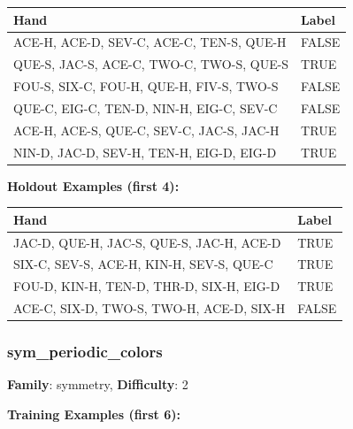 \documentclass[10pt,a4paper]{article}
\begin{document}
\begin{small}
\begin{tabular}{p{8cm}l}
\toprule
Hand & Label \\
\midrule
ACE-H, ACE-D, SEV-C, ACE-C, TEN-S, QUE-H & \textcolor{negative}{FALSE} \\
QUE-S, JAC-S, ACE-C, TWO-C, TWO-S, QUE-S & \textcolor{positive}{TRUE} \\
FOU-S, SIX-C, FOU-H, QUE-H, FIV-S, TWO-S & \textcolor{negative}{FALSE} \\
QUE-C, EIG-C, TEN-D, NIN-H, EIG-C, SEV-C & \textcolor{negative}{FALSE} \\
ACE-H, ACE-S, QUE-C, SEV-C, JAC-S, JAC-H & \textcolor{positive}{TRUE} \\
NIN-D, JAC-D, SEV-H, TEN-H, EIG-D, EIG-D & \textcolor{positive}{TRUE} \\
\bottomrule
\end{tabular}
\end{small}

\textbf{Holdout Examples (first 4):}

\begin{small}
\begin{tabular}{p{8cm}l}
\toprule
Hand & Label \\
\midrule
JAC-D, QUE-H, JAC-S, QUE-S, JAC-H, ACE-D & \textcolor{positive}{TRUE} \\
SIX-C, SEV-S, ACE-H, KIN-H, SEV-S, QUE-C & \textcolor{positive}{TRUE} \\
FOU-D, KIN-H, TEN-D, THR-D, SIX-H, EIG-D & \textcolor{positive}{TRUE} \\
ACE-C, SIX-D, TWO-S, TWO-H, ACE-D, SIX-H & \textcolor{negative}{FALSE} \\
\bottomrule
\end{tabular}
\end{small}

\vspace{0.5cm}

\subsubsection{sym\_periodic\_colors}

\textbf{Family}: symmetry, \textbf{Difficulty}: 2

\textbf{Training Examples (first 6):}
\end{document}
